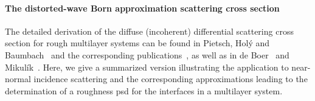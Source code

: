 \paragraph{The distorted-wave Born approximation scattering cross section}
The detailed derivation of the diffuse (incoherent) differential scattering cross section for rough multilayer systems can be found in Pietsch, Hol\'{y} and Baumbach~\cite{pietsch_high-resolution_2004} and the corresponding publications~\cite{sinha_x-ray_1988,holy_nonspecular_1994}, as well as in de Boer~\cite{de_boer_x-ray_1996} and Mikul\'{i}k~\cite{mikulik_x-ray_1997}. Here, we give a summarized version illustrating the application to near-normal incidence scattering and the corresponding approximations leading to the determination of a roughness \gls{psd} for the interfaces in a multilayer system.

